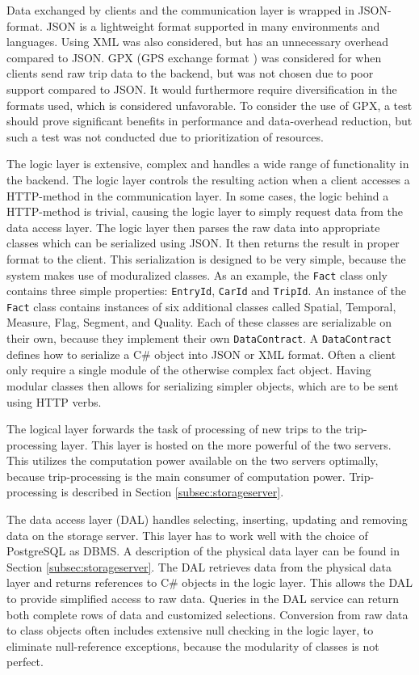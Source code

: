 Data exchanged by clients and the communication layer is wrapped in JSON-format. JSON is a lightweight format supported in many environments and languages. Using XML was also considered, but has an unnecessary overhead compared to JSON. GPX (GPS exchange format \citep{GPX_format}) was considered for when clients send raw trip data to the backend, but was not chosen due to poor support compared to JSON. It would furthermore require diversification in the formats used, which is considered unfavorable. To consider the use of GPX, a test should prove significant benefits in performance and data-overhead reduction, but such a test was not conducted due to prioritization of resources. 

The logic layer is extensive, complex and handles a wide range of functionality in the backend. The logic layer controls the resulting action when a client accesses a HTTP-method in the communication layer. In some cases, the logic behind a HTTP-method is trivial, causing the logic layer to simply request data from the data access layer. The logic layer then parses the raw data into appropriate classes which can be serialized using JSON. It then returns the result in proper format to the client. This serialization is designed to be very simple, because the system makes use of moduralized classes. As an example, the \texttt{Fact} class only contains three simple properties: \texttt{EntryId}, \texttt{CarId} and \texttt{TripId}. An instance of the \texttt{Fact} class contains instances of six additional classes called Spatial, Temporal, Measure, Flag, Segment, and Quality. Each of these classes are serializable on their own, because they implement their own \texttt{DataContract}. A \texttt{DataContract} defines how to serialize a C\# object into JSON or XML format. Often a client only require a single module of the otherwise complex fact object. Having modular classes then allows for serializing simpler objects, which are to be sent using HTTP verbs.

The logical layer forwards the task of processing of new trips to the trip-processing layer. This layer is hosted on the more powerful of the two servers. This utilizes the computation power available on the two servers optimally, because trip-processing is the main consumer of computation power. Trip-processing is described in Section \ref{subsec:storageserver}. 

The data access layer (DAL) handles selecting, inserting, updating and removing data on the storage server. This layer has to work well with the choice of PostgreSQL as DBMS. A description of the physical data layer can be found in Section \ref{subsec:storageserver}. The DAL retrieves data from the physical data layer and returns references to C\# objects in the logic layer. This allows the DAL to provide simplified access to raw data. Queries in the DAL service can return both complete rows of data and customized selections. Conversion from raw data to class objects often includes extensive null checking in the logic layer, to eliminate null-reference exceptions, because the modularity of classes is not perfect. 